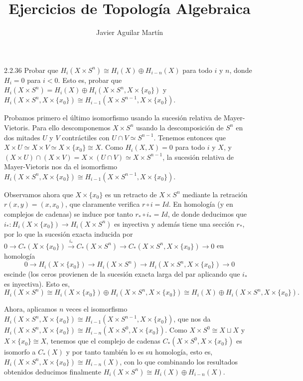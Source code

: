 \documentclass[twoside]{article}
\begin{document}
\title{Ejercicios de Topología Algebraica}
\author{Javier Aguilar Martín}
\maketitle

\begin{ejercicio}{2.2.36}
Probar que $H_i(X\times S^n)\cong H_i(X)\oplus H_{i-n}(X)$ para todo $i$ y $n$, donde $H_i=0$ para $i<0$. Esto es, probar que $H_i(X\times S^n)=H_i(X)\oplus H_i(X\times S^n,X\times\{x_0\})$ y $H_i(X\times S^n,X\times\{x_0\})\cong H_{i-1}(X\times S^{n-1},X\times\{x_0\})$.
\end{ejercicio}
\begin{solucion}
Probamos primero el último isomorfismo usando la sucesión relativa de Mayer-Vietoris. Para ello descomponemos $X\times S^n$ usando la descomposición de $S^n$ en dos mitades $U$ y $V$ contráctiles con $U\cap V\simeq S^{n-1}$. Tenemos entonces que $X\times U\simeq X\times V\simeq X\times \{x_0\}\cong X$. Como $H_i(X,X)=0$ para todo $i$ y $X$, y $(X\times U)\cap (X\times V)=X\times (U\cap V)\simeq X\times S^{n-1}$,  la sucesión relativa de Mayer-Vietoris nos da el isomorfismo $H_i(X\times S^n,X\times\{x_0\})\cong H_{i-1}(X\times S^{n-1},X\times\{x_0\})$. 

Observamos ahora que $X\times\{x_0\}$ es un retracto de $X\times S^n$ mediante la retración $r(x,y)=(x,x_0)$, que claramente verifica $r\circ i=Id$. En homología (y en complejos de cadenas) se induce por tanto $r_*\circ i_*=Id$, de donde deducimos que $i_*:H_i(X\times\{x_0\})\to H_i(X\times S^n)$ es inyectiva y además tiene una sección $r_*$, por lo que la sucesión exacta inducida por $0\to C_*(X\times\{x_0\})\xrightarrow{i_*} C_*(X\times S^n)\to C_*(X\times S^n,X\times\{x_0\})\to 0$ en homología
\[
0\to H_i(X\times\{x_0\})\to H_i(X\times S^n)\to H_i(X\times S^n,X\times\{x_0\})\to 0
\]
escinde (los ceros provienen de la sucesión exacta larga del par aplicando que $i_*$ es inyectiva). Esto es, $$H_i(X\times S^n)\cong  H_i(X\times\{x_0\})\oplus H_i(X\times S^n,X\times\{x_0\})\cong H_i(X)\oplus H_i(X\times S^n,X\times\{x_0\}).$$

Ahora, aplicamos $n$ veces el isomorfismo $H_i(X\times S^n,X\times\{x_0\})\cong H_{i-1}(X\times S^{n-1},X\times\{x_0\})$, que nos da $H_i(X\times S^n,X\times\{x_0\})\cong H_{i-n}(X\times S^0,X\times\{x_0\})$. Como $X\times S^0\cong X\sqcup X$ y $X\times \{x_0\}\cong X$, tenemos que el complejo de cadenas $C_*(X\times S^0,X\times\{x_0\})$ es isomorfo a $C_*(X)$ y por tanto también lo es su homología, esto es, $H_i(X\times S^n,X\times\{x_0\})\cong H_{i-n}(X)$, con lo que combinando los resultados obtenidos deducimos finalmente
$
H_i(X\times S^n)\cong H_i(X)\oplus H_{i-n}(X).
$

\end{solucion}
\end{document}
